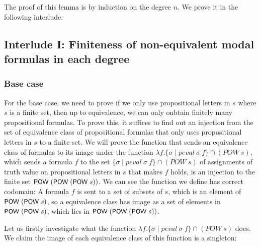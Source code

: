 \documentclass[letterpaper]{article}
\renewcommand{\HOLConst}[1]{{\textsf{\upshape\small #1}}}
\renewcommand{\HOLinline}[1]{\ensuremath{#1}}
\begin{document}
The proof of this lemma is by induction on the degree $n$. We prove it in the following interlude:

\subsection{Interlude I: Finiteness of non-equivalent modal formulas in each degree}

\subsubsection{Base case}
For the base case, we need to prove if we only use propositional letters in $s$ where $s$ is a finite set, then up to equivalence, we can only onbtain finitely many propositional formulas. To prove this, it suffices to find out an injection from the set of equivalence class of propositional formulas that only uses propositional letters in $s$ to a finite set. We will prove the function that sends an equivalence class of formulas to its image under the function $\lambda f. \{\sigma \mid peval\ \sigma\ f\} \cap (POW \ s)$, which sends a formula $f$ to the set $\{\sigma \mid peval\ \sigma\ f\} \cap (POW \ s)$ of assignments of truth value on propositional letters in $s$ that makes $f$ holds, is an injection to the finite set \HOLinline{\HOLConst{POW}\;(\HOLConst{POW}\;(\HOLConst{POW}\;\HOLFreeVar{s}))}. We can see the function we define has correct codomain: A formula $f$ is sent to a set of subsets of $s$, which is an element of \HOLinline{\HOLConst{POW}\;(\HOLConst{POW}\;\HOLFreeVar{s})}, so a equivalence class has image as a set of elements in \HOLinline{\HOLConst{POW}\;(\HOLConst{POW}\;\HOLFreeVar{s})}, which lies in \HOLinline{\HOLConst{POW}\;(\HOLConst{POW}\;(\HOLConst{POW}\;\HOLFreeVar{s}))}.

Let us firstly investigate what the function $\lambda f. \{\sigma \mid peval\ \sigma\ f\} \cap (POW \ s)$ does. We claim the image of each equivalence class of this function is a singleton:
\end{document}
